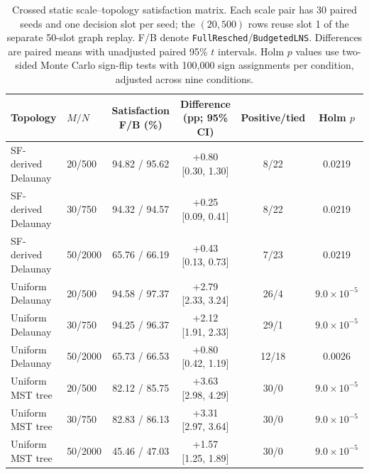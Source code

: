 \documentclass[preprint,12pt]{elsarticle}
\begin{document}
\begin{table}[htbp]\centering
\caption{Crossed static scale--topology satisfaction matrix. Each scale pair has 30 paired seeds and one decision slot per seed; the $(20,500)$ rows reuse slot 1 of the separate 50-slot graph replay. F/B denote \texttt{FullResched}/\texttt{BudgetedLNS}. Differences are paired means with unadjusted paired 95\% $t$ intervals. Holm $p$ values use two-sided Monte Carlo sign-flip tests with 100,000 sign assignments per condition, adjusted across nine conditions.}\label{tab:static-scale-topology-service}
\scriptsize\setlength{\tabcolsep}{2pt}\renewcommand{\arraystretch}{1.10}
\begin{tabular}{llcccc}\toprule
Topology & $M/N$ & Satisfaction F/B (\%) & Difference (pp; 95\% CI) & Positive/tied & Holm $p$ \\ \midrule
SF-derived Delaunay & 20/500 & 94.82 / 95.62 & +0.80 [0.30, 1.30] & 8/22 & 0.0219 \\
SF-derived Delaunay & 30/750 & 94.32 / 94.57 & +0.25 [0.09, 0.41] & 8/22 & 0.0219 \\
SF-derived Delaunay & 50/2000 & 65.76 / 66.19 & +0.43 [0.13, 0.73] & 7/23 & 0.0219 \\
Uniform Delaunay & 20/500 & 94.58 / 97.37 & +2.79 [2.33, 3.24] & 26/4 & $9.0\times10^{-5}$ \\
Uniform Delaunay & 30/750 & 94.25 / 96.37 & +2.12 [1.91, 2.33] & 29/1 & $9.0\times10^{-5}$ \\
Uniform Delaunay & 50/2000 & 65.73 / 66.53 & +0.80 [0.42, 1.19] & 12/18 & 0.0026 \\
Uniform MST tree & 20/500 & 82.12 / 85.75 & +3.63 [2.98, 4.29] & 30/0 & $9.0\times10^{-5}$ \\
Uniform MST tree & 30/750 & 82.83 / 86.13 & +3.31 [2.97, 3.64] & 30/0 & $9.0\times10^{-5}$ \\
Uniform MST tree & 50/2000 & 45.46 / 47.03 & +1.57 [1.25, 1.89] & 30/0 & $9.0\times10^{-5}$ \\
\bottomrule\end{tabular}
\end{table}
\end{document}
